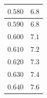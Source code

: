 \documentclass[letterpaper, 12pt]{article}
\begin{document}
\begin{longtable}{|c|c|}
    \hline
    $0.580$                                                                                                                                                                     & $6.8$                                                                                                                                                                                  \\
    \hline
    $0.590$                                                                                                                                                                     & $6.8$                                                                                                                                                                                  \\
    \hline
    $0.600$                                                                                                                                                                     & $7.1$                                                                                                                                                                                  \\
    \hline
    $0.610$                                                                                                                                                                     & $7.2$                                                                                                                                                                                  \\
    \hline
    $0.620$                                                                                                                                                                     & $7.3$                                                                                                                                                                                  \\
    \hline
    $0.630$                                                                                                                                                                     & $7.4$                                                                                                                                                                                  \\
    \hline
    $0.640$                                                                                                                                                                     & $7.6$                                                                                                                                                                                  \\

\end{longtable}
\end{document}
